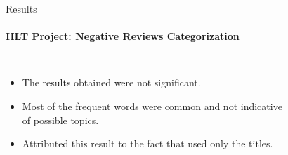 \documentclass{beamer}
\theoremstyle{definition}
\theoremstyle{plain}
\begin{document}
\begin{frame}{Results}
\framesubtitle{HLT Project: Negative Reviews Categorization}
{\small 
\begin{columns}
    \begin{itemize}
        \item The results obtained were not significant.
        \item Most of the frequent words were common and not indicative of possible topics.
        \item Attributed this result to the fact that used only the titles.
    \end{itemize}
    
    \vspace{-0.5cm}
    \begin{figure}
        \centering
    \end{figure}
\end{columns}
}
\end{frame}
\end{document}
